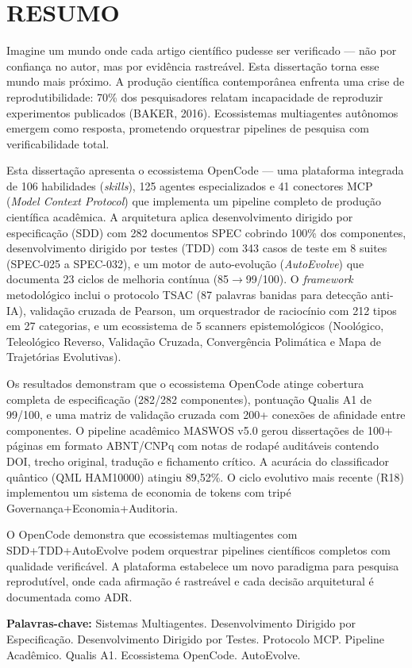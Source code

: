 \chapter*{RESUMO}
\thispagestyle{empty}

Imagine um mundo onde cada artigo científico pudesse ser verificado — não por confiança no autor, mas por evidência rastreável. Esta dissertação torna esse mundo mais próximo. A produção científica contemporânea enfrenta uma crise de reprodutibilidade: 70\% dos pesquisadores relatam incapacidade de reproduzir experimentos publicados (BAKER, 2016). Ecossistemas multiagentes autônomos emergem como resposta, prometendo orquestrar pipelines de pesquisa com verificabilidade total.

Esta dissertação apresenta o ecossistema OpenCode --- uma plataforma integrada de 106 habilidades (\textit{skills}), 125 agentes especializados e 41 conectores MCP (\textit{Model Context Protocol}) que implementa um pipeline completo de produção científica acadêmica. A arquitetura aplica desenvolvimento dirigido por especificação (SDD) com 282 documentos SPEC cobrindo 100\% dos componentes, desenvolvimento dirigido por testes (TDD) com 343 casos de teste em 8 suites (SPEC-025 a SPEC-032), e um motor de auto-evolução (\textit{AutoEvolve}) que documenta 23 ciclos de melhoria contínua (85$\rightarrow$99/100). O \textit{framework} metodológico inclui o protocolo TSAC (87 palavras banidas para detecção anti-IA), validação cruzada de Pearson, um orquestrador de raciocínio com 212 tipos em 27 categorias, e um ecossistema de 5 scanners epistemológicos (Noológico, Teleológico Reverso, Validação Cruzada, Convergência Polimática e Mapa de Trajetórias Evolutivas).

Os resultados demonstram que o ecossistema OpenCode atinge cobertura completa de especificação (282/282 componentes), pontuação Qualis A1 de 99/100, e uma matriz de validação cruzada com 200+ conexões de afinidade entre componentes. O pipeline acadêmico MASWOS v5.0 gerou dissertações de 100+ páginas em formato ABNT/CNPq com notas de rodapé auditáveis contendo DOI, trecho original, tradução e fichamento crítico. A acurácia do classificador quântico (QML HAM10000) atingiu 89,52\%. O ciclo evolutivo mais recente (R18) implementou um sistema de economia de tokens com tripé Governança+Economia+Auditoria.

O OpenCode demonstra que ecossistemas multiagentes com SDD+\-TDD+\-Auto\-Evolve podem orquestrar pipelines científicos completos com qualidade verificável. A plataforma estabelece um novo paradigma para pesquisa reprodutível, onde cada afirmação é rastreável e cada decisão arquitetural é documentada como ADR.

\vspace{1cm}
\noindent\textbf{Palavras-chave:} Sistemas Multiagentes. Desenvolvimento Dirigido por Especificação. Desenvolvimento Dirigido por Testes. Protocolo MCP. Pipeline Acadêmico. Qualis A1. Ecossistema OpenCode. AutoEvolve.
\newpage
